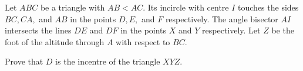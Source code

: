 Let $ABC$ be a triangle with $AB < AC$. Its incircle with centre $I$ touches the sides $BC, CA,$ and $AB$ in the points $D, E,$ and $F$ respectively. The angle bisector $AI$ intersects the lines $DE$ and $DF$ in the points $X$ and $Y$ respectively. Let $Z$ be the foot of the altitude through $A$ with respect to $BC$.

Prove that $D$ is the incentre of the triangle $XYZ$.